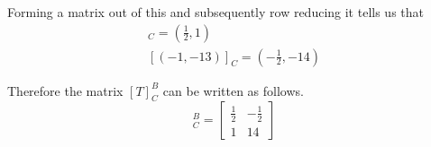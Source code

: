 \documentclass{article}
\newenvironment{answers}{ %
	\begin{enumerate}
		\setlength{\itemsep}{\bigskipamount}
}{\end{enumerate}}
\begin{document}
\begin{answers}
\begin{enumerate}
				Forming a matrix out of this and subsequently row reducing it tells us that
				\begin{gather*}
					[(1,-2)]_C = \left( \frac{1}{2}, 1 \right) \\
					[(-1,-13)]_C = \left( -\frac{1}{2}, -14 \right)
				\end{gather*}

				Therefore the matrix \([T]^B_C\) can be written as follows.
				\begin{equation*}
					[T]^B_C = \left[ \begin{matrix}
							\frac{1}{2} & -\frac{1}{2} \\[3pt]
							1           & 14
						\end{matrix} \right]
				\end{equation*}
		\end{enumerate}

\end{answers}
\end{document}
